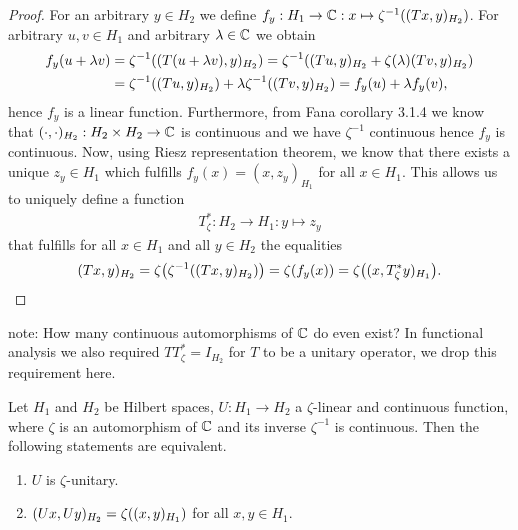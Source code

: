 \begin{proof}
	For an arbitrary $y \in H_2$ we define $f_y: H_1 \to \mathbb{C}: x \mapsto \zeta^{-1}{\left ( (Tx,y)_{H_2} \right )}$. For arbitrary $u,v \in H_1$ and arbitrary $\lambda \in \mathbb{C}$ we obtain
	\begin{align*}
		f_y(u + \lambda v) &= \zeta^{-1}{\left ( (T(u + \lambda v), y)_{H_2} \right )} = \zeta^{-1}{\left ( (Tu, y)_{H_2} + \zeta(\lambda) (Tv, y)_{H_2} \right )} \\
		&= \zeta^{-1}{\left ( (Tu,y)_{H_2} \right )} + \lambda \zeta^{-1}{\left ( (Tv,y)_{H_2} \right )} = f_y(u) + \lambda f_y(v),
	\end{align*}
	hence $f_y$ is a linear function. Furthermore, from Fana corollary 3.1.4 we know that $(\cdot, \cdot)_{H_2}: H_2 \times H_2 \to \mathbb{C}$ is continuous and we have $\zeta^{-1}$ continuous hence $f_y$ is continuous. Now, using Riesz representation theorem, we know that there exists a unique $z_y \in H_1$ which fulfills $f_y(x) = (x,z_y)_{H_1}$ for all $x \in H_1$. This allows us to uniquely define a function
	\begin{align*}
		T_\zeta^\ast: H_2 \to H_1: y \mapsto z_y
	\end{align*}
	that fulfills for all $x \in H_1$ and all $y \in H_2$ the equalities
	\begin{align*}
		(Tx,y)_{H_2} = \zeta{\left ( \zeta^{-1}{\left ( (Tx,y)_{H_2} \right )} \right )} = \zeta{\left ( f_y(x) \right )} = \zeta {\left ( (x, T_\zeta^\ast y)_{H_1} \right )}.
	\end{align*}
\end{proof}

note: How many continuous automorphisms of $\mathbb{C}$ do even exist? In functional analysis we also required $T T_\zeta^\ast = I_{H_2}$ for $T$ to be a unitary operator, we drop this requirement here.

\begin{proposition}
	Let $H_1$ and $H_2$ be Hilbert spaces, $U: H_1 \to H_2$ a $\zeta$-linear and continuous function, where $\zeta$ is an automorphism of $\mathbb{C}$ and its inverse $\zeta^{-1}$ is continuous. Then the following statements are equivalent.
	\begin{enumerate}[label = (\roman*)]
		\item $U$ is $\zeta$-unitary. 
		\item $(Ux , Uy)_{H_2} = \zeta{\left ( (x,y)_{H_1} \right )}$ for all $x,y \in H_1$.
	\end{enumerate}
\end{proposition}

